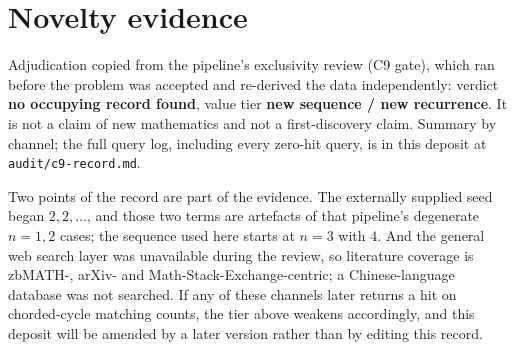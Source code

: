 \documentclass[11pt]{article}
\theoremstyle{definition}
\begin{document}
\section{Novelty evidence}\label{sec:novelty}

Adjudication copied from the pipeline's exclusivity review (C9 gate), which ran
before the problem was accepted and re-derived the data independently: verdict
\textbf{no occupying record found}, value tier \textbf{new sequence / new
recurrence}. It is not a claim of new mathematics and not a first-discovery
claim. Summary by channel; the full query log, including every zero-hit query,
is in this deposit at \texttt{audit/c9-record.md}.

\begin{center}
\end{center}

Two points of the record are part of the evidence. The externally supplied seed
began $2,2,\dots$, and those two terms are artefacts of that pipeline's
degenerate $n=1,2$ cases; the sequence used here starts at $n=3$ with $4$. And
the general web search layer was unavailable during the review, so literature
coverage is zbMATH-, arXiv- and Math-Stack-Exchange-centric; a
Chinese-language database was not searched. If any of these channels later
returns a hit on chorded-cycle matching counts, the tier above weakens
accordingly, and this deposit will be amended by a later version rather than by
editing this record.
\end{document}
